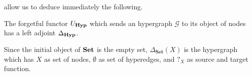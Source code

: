 \documentclass[a4paper,UKenglish,cleveref,pdftex,thm-restate,numberwithinsect]{lipics-v2021}
\newcommand{\Set}{\mathbf{Set}}
\newcommand{\catname}[1]{\textbf{\textup{#1}}}
\newcommand{\hyp}{\catname{Hyp}}
\begin{document}

 allow us to deduce immediately the following.

\begin{proposition}\label{cor:left}  The forgetful functor $U_{\hyp}$ which sends an hypergraph $\mathcal{G}$ to its object of nodes has a left adjoint $\Delta_{\hyp}$.
\end{proposition}

\begin{example}Since the initial object of $\catname{Set}$ is the empty set,  $\Delta_{\Set}(X)$ is the hypergraph which has $X$ as set of nodes, $\emptyset$ as set of hyperedges, and $?_X$ as source and target function.
\end{example}

\end{document}
